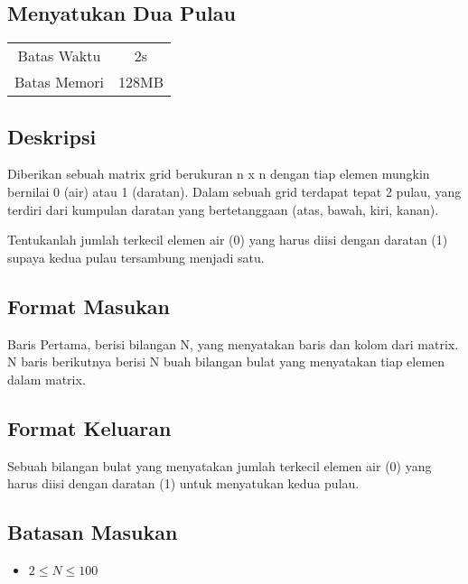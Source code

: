 \documentclass{article}
\begin{document}
\begin{center}
    \section*{Menyatukan Dua Pulau} %

    \begin{tabular}{ | c c | }
        \hline
        Batas Waktu  & 2s \\    %
        Batas Memori & 128MB \\  %
        \hline
    \end{tabular}
\end{center}

\subsection*{Deskripsi}
Diberikan sebuah matrix grid berukuran n x n dengan tiap elemen mungkin bernilai 0 (air) atau 1 (daratan). Dalam sebuah grid terdapat tepat 2 pulau, yang terdiri dari kumpulan daratan yang bertetanggaan (atas, bawah, kiri, kanan). 

Tentukanlah jumlah terkecil elemen air (0) yang harus diisi dengan daratan (1) supaya kedua pulau tersambung menjadi satu. 



\subsection*{Format Masukan}
Baris Pertama, berisi bilangan N, yang menyatakan baris dan kolom dari matrix.
N baris berikutnya berisi N buah bilangan bulat yang menyatakan tiap elemen dalam matrix.


\subsection*{Format Keluaran}
Sebuah bilangan bulat yang menyatakan jumlah terkecil elemen air (0) yang harus diisi dengan daratan (1) untuk menyatukan kedua pulau.

\subsection*{Batasan Masukan}
\begin{itemize}
 \item $2 \leq  N  \leq 100$
\end{itemize}
\end{document}

